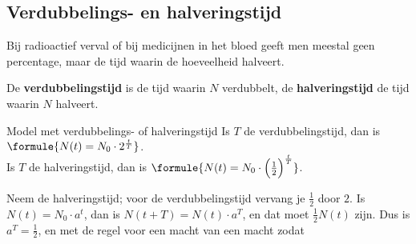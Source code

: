 
\begin{oefeningen}
\end{oefeningen}

\subsection{Verdubbelings- en halveringstijd}

Bij radioactief verval of bij medicijnen in het bloed geeft men meestal geen percentage, maar de tijd waarin de hoeveelheid halveert.

\begin{theorie}
De \textbf{\textcolor{accent}{verdubbelingstijd}} is de tijd waarin $N$ verdubbelt, de \textbf{\textcolor{accent}{halveringstijd}} de tijd waarin $N$ halveert.

\begin{stelling}{Model met verdubbelings- of halveringstijd}
Is $T$ de verdubbelingstijd, dan is $\formule{N(t) = N_0 \cdot 2^{\frac{t}{T}}}$. \\
Is $T$ de halveringstijd, dan is $\formule{N(t) = N_0 \cdot \Bigl(\frac12\Bigr)^{\frac{t}{T}}}$.
\end{stelling}
\begin{bewijs}
Neem de halveringstijd; voor de verdubbelingstijd vervang je $\frac12$ door $2$. Is $N(t) = N_0 \cdot a^t$, dan is $N(t + T) = N(t) \cdot a^T$, en dat moet $\frac12 N(t)$ zijn. Dus is $a^T = \frac12$, en met de regel voor een macht van een macht
zodat
\end{bewijs}
\end{theorie}

